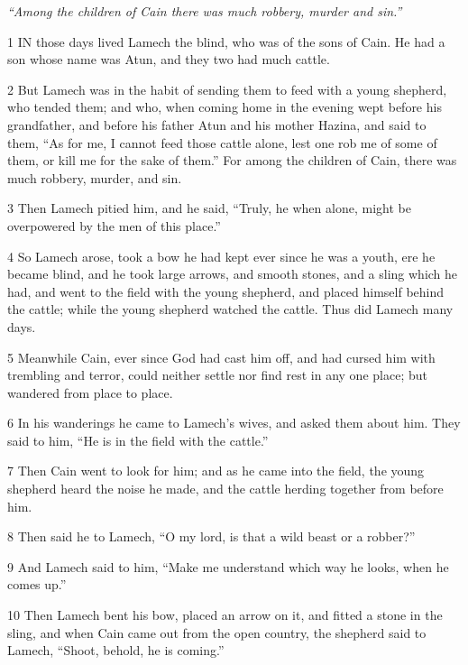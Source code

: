 \par \textit{“Among the children of Cain there was much robbery, murder and sin.”}

\par 1 IN those days lived Lamech the blind, who was of the sons of Cain. He had a son whose name was Atun, and they two had much cattle.

\par 2 But Lamech was in the habit of sending them to feed with a young shepherd, who tended them; and who, when coming home in the evening wept before his grandfather, and before his father Atun and his mother Hazina, and said to them, “As for me, I cannot feed those cattle alone, lest one rob me of some of them, or kill me for the sake of them.” For among the children of Cain, there was much robbery, murder, and sin.

\par 3 Then Lamech pitied him, and he said, “Truly, he when alone, might be overpowered by the men of this place.”

\par 4 So Lamech arose, took a bow he had kept ever since he was a youth, ere he became blind, and he took large arrows, and smooth stones, and a sling which he had, and went to the field with the young shepherd, and placed himself behind the cattle; while the young shepherd watched the cattle. Thus did Lamech many days.

\par 5 Meanwhile Cain, ever since God had cast him off, and had cursed him with trembling and terror, could neither settle nor find rest in any one place; but wandered from place to place.

\par 6 In his wanderings he came to Lamech's wives, and asked them about him. They said to him, “He is in the field with the cattle.”

\par 7 Then Cain went to look for him; and as he came into the field, the young shepherd heard the noise he made, and the cattle herding together from before him.

\par 8 Then said he to Lamech, “O my lord, is that a wild beast or a robber?”

\par 9 And Lamech said to him, “Make me understand which way he looks, when he comes up.”

\par 10 Then Lamech bent his bow, placed an arrow on it, and fitted a stone in the sling, and when Cain came out from the open country, the shepherd said to Lamech, “Shoot, behold, he is coming.”

